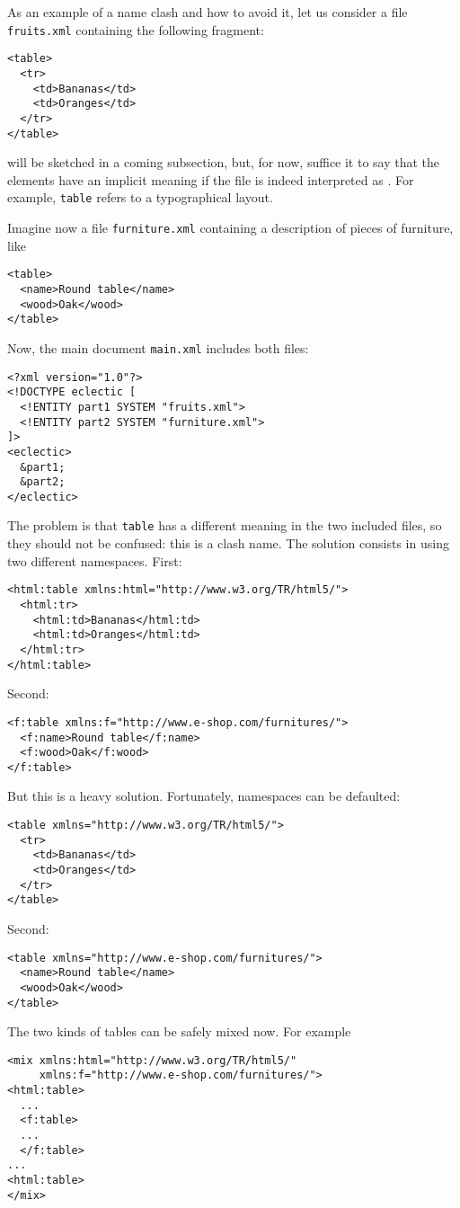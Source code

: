 As an example of a name clash and how to avoid it, let us consider a
file \texttt{fruits.xml} containing the following \HTML fragment:
\begin{verbatim}
<table>
  <tr>
    <td>Bananas</td>
    <td>Oranges</td>
  </tr>
</table>
\end{verbatim}
\HTML will be sketched in a coming subsection, but, for now, suffice
it to say that the elements have an implicit meaning if the file is
indeed interpreted as \HTML. For example, \texttt{table} refers to a
typographical layout.

Imagine now a file \texttt{furniture.xml} containing a description of
pieces of furniture, like
\begin{verbatim}
<table>
  <name>Round table</name>
  <wood>Oak</wood>
</table>
\end{verbatim}
Now, the main document \texttt{main.xml} includes both files:
\begin{verbatim}
<?xml version="1.0"?>
<!DOCTYPE eclectic [
  <!ENTITY part1 SYSTEM "fruits.xml">
  <!ENTITY part2 SYSTEM "furniture.xml">
]>
<eclectic>
  &part1;
  &part2;
</eclectic>
\end{verbatim}
The problem is that \texttt{table} has a different meaning in the two
included files, so they should not be confused: this is a clash
name. The solution consists in using two different namespaces. First:
\begin{verbatim}
<html:table xmlns:html="http://www.w3.org/TR/html5/">
  <html:tr>
    <html:td>Bananas</html:td>
    <html:td>Oranges</html:td>
  </html:tr>
</html:table>
\end{verbatim}
Second:
\begin{verbatim}
<f:table xmlns:f="http://www.e-shop.com/furnitures/">
  <f:name>Round table</f:name>
  <f:wood>Oak</f:wood>
</f:table>
\end{verbatim}
But this is a heavy solution. Fortunately, namespaces can be
defaulted:
\begin{verbatim}
<table xmlns="http://www.w3.org/TR/html5/">
  <tr>
    <td>Bananas</td>
    <td>Oranges</td>
  </tr>
</table>
\end{verbatim}
Second:
\begin{verbatim}
<table xmlns="http://www.e-shop.com/furnitures/">
  <name>Round table</name>
  <wood>Oak</wood>
</table>
\end{verbatim}
The two kinds of tables can be safely mixed now. For example
\begin{verbatim}
<mix xmlns:html="http://www.w3.org/TR/html5/"
     xmlns:f="http://www.e-shop.com/furnitures/">
<html:table>
  ...
  <f:table>
  ...
  </f:table>
...
<html:table>
</mix>
\end{verbatim}
